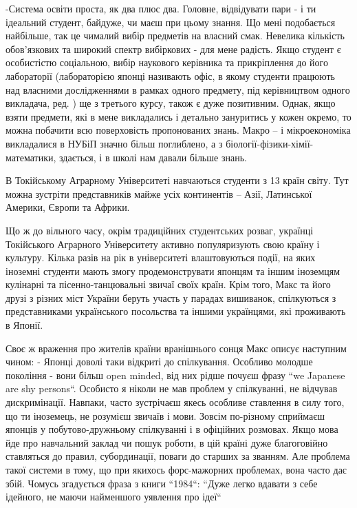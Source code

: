 \documentclass[10pt,a4paper]{article}
\begin{document}
\begin{multicols}{3}
-Система освіти проста, як два плюс два. Головне, відвідувати пари - і ти ідеальний студент, байдуже, чи маєш при цьому знання. Що мені подобається найбільше, так це чималий вибір предметів на власний смак. Невелика кількість обов'язкових та широкий спектр вибіркових - для мене радість. Якщо студент є особистістю соціальною, вибір наукового керівника та прикріплення до його лабораторії (лабораторією японці називають офіс, в якому студенти працюють над власними дослідженнями в рамках одного предмету, під керівництвом одного викладача, ред. ) ще з третього курсу, також є дуже позитивним. Однак, якщо взяти предмети, які в мене викладались і детально зануритись у кожен окремо, то можна побачити всю поверховість пропонованих знань. Макро – і мікроекономіка викладалися в НУБіП значно більш поглиблено, а з біології-фізики-хімії-математики, здається, і в школі нам давали більше знань.

В Токійському Аграрному Університеті навчаються студенти з 13 країн світу. Тут можна зустріти представників майже усіх континентів – Азії, Латинської Америки, Європи та Африки.

Що ж до вільного часу, окрім традиційних студентських розваг, українці Токійського Аграрного Університету активно популяризують свою країну і культуру. Кілька разів на рік в університеті влаштовуються події, на яких іноземні студенти мають змогу продемонструвати японцям та іншим іноземцям кулінарні та пісенно-танцювальні звичаї своїх країн. Крім того, Макс та його друзі з різних міст України беруть участь у парадах вишиванок, спілкуються з представниками українського посольства та іншими українцями, які проживають в Японії.

Своє ж враження про жителів країни вранішнього сонця Макс описує наступним чином:   - Японці доволі таки відкриті до спілкування. Особливо молодше покоління - вони більш open minded, від них рідше почуєш фразу  ``we Japanese are shy persons``. Особисто я ніколи не мав проблем у спілкуванні, не відчував дискримінації. Навпаки, часто зустрічаєш якесь особливе ставлення в силу того, що ти іноземець, не розумієш звичаїв і мови. Зовсім по-різному сприймаєш японців у побутово-дружньому спілкуванні і в офіційних розмовах. Якщо мова йде про навчальний заклад чи пошук роботи, в цій країні дуже благоговійно ставляться до правил, субординації, поваги до старших за званням. Але проблема такої системи в тому, що при якихось форс-мажорних проблемах, вона часто дає збій. Чомусь згадується фраза з книги ``1984``: ``Дуже легко вдавати з себе ідейного, не маючи найменшого уявлення про ідеї``


\end{multicols}
\end{document}
